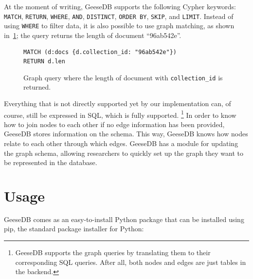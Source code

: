At the moment of writing, GeeseDB supports the following Cypher keywords: \texttt{MATCH}, \texttt{RETURN}, \texttt{WHERE}, \texttt{AND}, \texttt{DISTINCT}, \texttt{ORDER BY}, \texttt{SKIP}, and \texttt{LIMIT}. Instead of using \texttt{WHERE} to filter data, it is also possible to use graph matching, as shown in~\cref{fig:graph_query2}; the query returns the length of document ``96ab542e''. 
\begin{figure}
	\begin{verbatim}
MATCH (d:docs {d.collection_id: "96ab542e"})
RETURN d.len
	\end{verbatim}
	\caption{Graph query where the length of document with \texttt{collection\_id} is returned.}
	\label{fig:graph_query2}
\end{figure}
Everything that is not directly supported yet by our implementation can, of course, still be expressed in SQL, which is fully supported. \footnote{GeeseDB supports the graph queries by translating them to their corresponding SQL queries. After all, both nodes and edges are just tables in the backend.} In order to know how to join nodes to each other if no edge information has been provided, GeeseDB stores information on the schema. This way, GeeseDB knows how nodes relate to each other through which edges. GeeseDB has a module for updating the graph schema, allowing researchers to quickly set up the graph they want to be represented in the database.

\section{Usage}
GeeseDB comes as an easy-to-install Python package that can be installed using pip, the standard package installer for Python:

